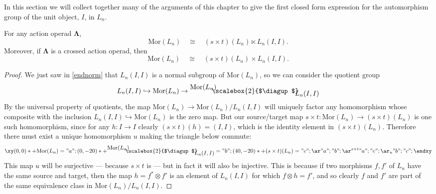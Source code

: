 \documentclass{amsbook} %
\newcommand{\ML}{\mathbf{\Lambda}}
\newcommand{\MorLn}{\mathrm{Mor}(L_n)}
\newcommand{\bigquotient}[2]{ \raisebox{0.75\height}{$#1$} \mkern-12mu\scalebox{2}{$\diagup$}\mkern-10mu \raisebox{-0.5\height}{$#2$} }
\numberwithin{section}{chapter}
\begin{document}
In this section we will collect together many of the arguments of this chapter to give the first closed form expression for the automorphism group of the unit object, $I$, in $L_n$.
\begin{prop}\label{morprod} For any action operad $\ML$,
  \[
    \MorLn \quad \cong \quad (s \times t)(L_n) \ltimes L_n(I,I).
  \]
Moreover, if $\ML$ is a crossed action operad, then
  \[
    \MorLn \quad \cong \quad (s \times t)(L_n) \times L_n(I,I).
  \]
\end{prop}
\begin{proof}
We just saw in \cref{endnorm} that $L_n(I,I)$ is a normal subgroup of $\MorLn$, so we can consider the quotient group
\[
  L_n(I,I) \hookrightarrow \MorLn \rightarrow \bigquotient{\MorLn}{L_n(I,I)}
\]
By the universal property of quotients, the map $\MorLn \rightarrow \MorLn / L_n(I,I)$ will uniquely factor any homomorphism whose composite with the inclusion $L_n(I,I) \hookrightarrow \MorLn$ is the zero map. But our source/target map $s \times t \colon \MorLn \rightarrow (s \times t)(L_n)$ is one such homomorphism, since for any $h \colon  I \rightarrow I$ clearly $(s \times t)(h) = (I, I)$, which is the identity element in $(s \times t)(L_n)$. Therefore there must exist a unique homomorphism $u$ making the triangle below commute:
  \[
    \xy
      (0,0)*+{\MorLn}="a";
      (0,-20)*+{\bigquotient{\MorLn}{L_n(I,I)}}="b";
      (40,-20)*+{(s \times t)(L_n)}="c";
      {\ar "a" ; "b"};
      {\ar^{s \times t} "a" ; "c"};
      {\ar_{u} "b" ; "c"};
    \endxy
  \]
This map $u$ will be surjective --- because $s \times t$ is --- but in fact it will also be injective. This is because if two morphisms $f, f'$ of $L_n$ have the same source and target, then the map $h = f^* \otimes f'$ is an element of $L_n(I,I)$ for which $f \otimes h = f'$, and so clearly $f$ and $f'$ are part of the same equivalence class in $\MorLn/L_n(I,I)$. 


\end{proof}
\end{document}
